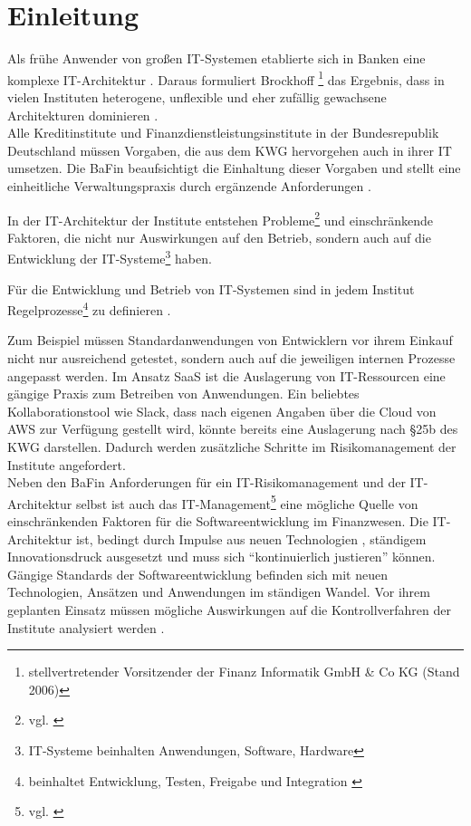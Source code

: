 \chapter{Einleitung}
\label{ch:intro}

Als frühe Anwender von großen IT-Systemen etablierte sich in Banken eine komplexe IT-Architektur \cite{Brockhoff2006}. Daraus formuliert Brockhoff \cite{Brockhoff2006} \footnote{stellvertretender Vorsitzender der Finanz Informatik GmbH \& Co KG (Stand 2006)} das Ergebnis, dass in vielen Instituten heterogene, unflexible und eher zufällig gewachsene Architekturen dominieren \cite{Brockhoff2006}.
\medskip
\\
Alle Kreditinstitute und Finanzdienstleistungsinstitute in der Bundesrepublik Deutschland müssen Vorgaben, die aus dem \ac{KWG} hervorgehen auch in ihrer IT umsetzen. Die \ac{BaFin} beaufsichtigt die Einhaltung dieser Vorgaben und stellt eine einheitliche Verwaltungspraxis \cite{BaFin:Verwaltungspraxis} durch ergänzende Anforderungen \cite{MaRisk:2017, BAIT:2018}. 

In der IT-Architektur der Institute entstehen Probleme\footnote{vgl. \cite{mci/Disterer2011}} und einschränkende Faktoren, die nicht nur Auswirkungen auf den Betrieb, sondern auch auf die Entwicklung der IT-Systeme\footnote{IT-Systeme beinhalten Anwendungen, Software, Hardware} haben. 

Für die Entwicklung und Betrieb von IT-Systemen sind in jedem Institut Regelprozesse\footnote{beinhaltet Entwicklung, Testen, Freigabe und Integration \cite{MaRisk:2017}} zu definieren \cite{MaRisk:2017}. 

Zum Beispiel müssen Standardanwendungen von Entwicklern vor ihrem Einkauf nicht nur ausreichend getestet, sondern auch auf die jeweiligen internen Prozesse angepasst werden. Im Ansatz \ac{SaaS} ist die Auslagerung von IT-Ressourcen eine gängige Praxis zum Betreiben von Anwendungen. Ein beliebtes Kollaborationstool wie Slack, dass nach eigenen Angaben über die Cloud von \ac{AWS} zur Verfügung gestellt wird, könnte bereits eine Auslagerung nach §25b des \ac{KWG} darstellen. Dadurch werden zusätzliche Schritte im Risikomanagement der Institute angefordert.
\medskip
\\
Neben den BaFin Anforderungen für ein IT-Risikomanagement und der IT-Architektur selbst ist auch das IT-Management\footnote{vgl. \cite{Alt2017}} eine mögliche Quelle von einschränkenden Faktoren für die Softwareentwicklung im Finanzwesen. Die IT-Architektur ist, bedingt durch Impulse aus neuen Technologien \cite{Bussmann2006}, ständigem Innovationsdruck ausgesetzt und muss sich \enquote{kontinuierlich justieren} \cite{Bussmann2006} können. 
\medskip
\\
Gängige Standards der Softwareentwicklung befinden sich mit neuen Technologien, Ansätzen und Anwendungen im ständigen Wandel. Vor ihrem geplanten Einsatz müssen mögliche Auswirkungen auf die Kontrollverfahren der Institute analysiert werden \cite{MaRisk:2017}.

